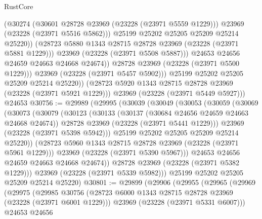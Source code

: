 \begin{lexlean}{RustCore}
\begin{coremodule}
                        (@30274
                          (@30601 @28728 @23969 (@23228 (@23971 @5559 @1229)))
                          @23969
                          (@23228 (@23971 @5516 @5862)))
                        @25199
                        @25202
                        @25205
                        @25209
                        @25214
                        @25220))
                    (@28723 @5880 @1343 @28715 @28728 @23969 (@23228 (@23971 @5881 @1229)))
                    @23969
                    (@23228 (@23971 @5508 @5887)))
                  @24653
                  @24656
                  @24659
                  @24663
                  @24668
                  @24674))
              @28728
              @23969
              (@23228 (@23971 @5500 @1229)))
            @23969
            (@23228 (@23971 @5457 @5902)))
          @25199
          @25202
          @25205
          @25209
          @25214
          @25220))
      (@28723 @5920 @1343 @28715 @28728 @23969 (@23228 (@23971 @5921 @1229)))
      @23969
      (@23228 (@23971 @5449 @5927)))
    @24653
@30756 := @29989
    (@29995
      (@30039
        (@30049
          (@30053
            (@30059
              (@30069
                (@30073
                  (@30079
                    (@30123
                      (@30133
                        (@30137 (@30684 @24656 @24659 @24663 @24668 @24674))
                        @28728
                        @23969
                        (@23228 (@23971 @5441 @1229)))
                      @23969
                      (@23228 (@23971 @5398 @5942)))
                    @25199
                    @25202
                    @25205
                    @25209
                    @25214
                    @25220))
                (@28723 @5960 @1343 @28715 @28728 @23969 (@23228 (@23971 @5961 @1229)))
                @23969
                (@23228 (@23971 @5390 @5967)))
              @24653
              @24656
              @24659
              @24663
              @24668
              @24674))
          @28728
          @23969
          (@23228 (@23971 @5382 @1229)))
        @23969
        (@23228 (@23971 @5339 @5982)))
      @25199
      @25202
      @25205
      @25209
      @25214
      @25220)
@30801 := @29899
    (@29906
      (@29955
        (@29965
          (@29969
            (@29975
              (@29985
                @30756
                (@28723 @6000 @1343 @28715 @28728 @23969 (@23228 (@23971 @6001 @1229)))
                @23969
                (@23228 (@23971 @5331 @6007)))
              @24653
              @24656

\end{coremodule}
\end{lexlean}
